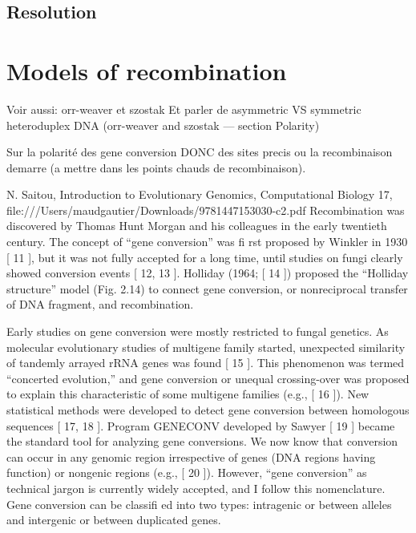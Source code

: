 \subsection{Resolution}



\section{Models of recombination}

Voir aussi: orr-weaver et szostak
Et parler de asymmetric VS symmetric heteroduplex DNA (orr-weaver and szostak — section Polarity)


Sur la polarité des gene conversion DONC des sites precis ou la recombinaison demarre (a mettre dans les points chauds de recombinaison).

N. Saitou, Introduction to Evolutionary Genomics, Computational Biology 17,
file:///Users/maudgautier/Downloads/9781447153030-c2.pdf
Recombination was discovered by Thomas Hunt Morgan and his colleagues in the
early twentieth century. The concept of “gene conversion” was fi rst proposed by
Winkler in 1930 [ 11  ], but it was not fully accepted for a long time, until studies on
fungi clearly showed conversion events [ 12, 13  ]. Holliday (1964; [ 14  ]) proposed the
“Holliday structure” model (Fig. 2.14) to connect gene conversion, or nonreciprocal
transfer of DNA fragment, and recombination.


Early studies on gene conversion were mostly restricted to fungal genetics. As
molecular evolutionary studies of multigene family started, unexpected similarity
of tandemly arrayed rRNA genes was found [ 15  ]. This phenomenon was termed
“concerted evolution,” and gene conversion or unequal crossing-over was proposed
to explain this characteristic of some multigene families (e.g., [ 16  ]). New statistical
methods were developed to detect gene conversion between homologous
sequences [ 17, 18  ]. Program GENECONV developed by Sawyer [ 19  ] became the
standard tool for analyzing gene conversions. We now know that conversion can
occur in any genomic region irrespective of genes (DNA regions having function)
or nongenic regions (e.g., [ 20  ]). However, “gene conversion” as technical jargon is
currently widely accepted, and I follow this nomenclature. Gene conversion can be
classifi ed into two types: intragenic or between alleles and intergenic or between
duplicated genes. 


